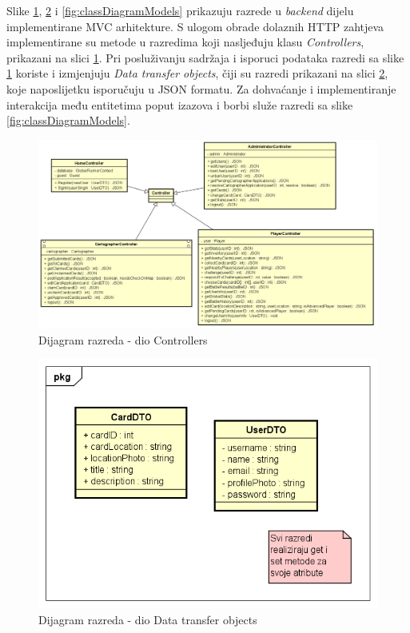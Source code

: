 			Slike \ref{fig:classDiagramControllers}, \ref{fig:classDiagramDTO} i \ref{fig:classDiagramModels} prikazuju razrede u \textit{backend} dijelu implementirane MVC arhitekture. S ulogom obrade dolaznih HTTP zahtjeva implementirane su metode u razredima koji nasljeđuju klasu \textit{Controllers}, prikazani na slici \ref{fig:classDiagramControllers}. Pri posluživanju sadržaja i isporuci podataka razredi sa slike \ref{fig:classDiagramControllers} koriste i izmjenjuju \textit{Data transfer objects}, čiji su razredi prikazani na slici \ref{fig:classDiagramDTO}, koje naposlijetku isporučuju u JSON formatu. Za dohvaćanje i implementiranje interakcija među entitetima poput izazova i borbi služe razredi sa slike \ref{fig:classDiagramModels}. 
			\begin{figure}[H]
        			\includegraphics[width=\textwidth]{slike/ClassDiagrams/controllers.png}
        			\centering
        			\caption{Dijagram razreda - dio Controllers}
        			\label{fig:classDiagramControllers}
        		\end{figure}
        		
    		\begin{figure}[H]
    			\includegraphics[scale=1]{slike/ClassDiagrams/DTO.png}
    			\centering
    			\caption{Dijagram razreda - dio Data transfer objects}
    			\label{fig:classDiagramDTO}
    		\end{figure}
    		
